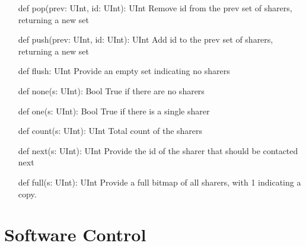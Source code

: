 \begin{itemize}
\item[def pop(prev: UInt, id: UInt): UInt]
Remove id from the prev set of sharers, returning a new set
\item[def push(prev: UInt, id: UInt): UInt]
Add id to the prev set of sharers, returning a new set
\item[def flush: UInt]
Provide an empty set indicating no sharers
\item[def none(s: UInt): Bool]
True if there are no sharers
\item[def one(s: UInt): Bool]
True if there is a single sharer
\item[def count(s: UInt): UInt]
Total count of the sharers
\item[def next(s: UInt): UInt]
Provide the id of the sharer that should be contacted next
\item[def full(s: UInt): UInt]
Provide a full bitmap of all sharers, with 1 indicating a copy.
\end{itemize}

\section{Software Control}


